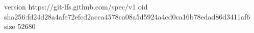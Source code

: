 version https://git-lfs.github.com/spec/v1
oid sha256:fd24d28a4afe72efcd2acca4578ca08a5d5924a4cd0ca16b78edad86d3411af6
size 52680
